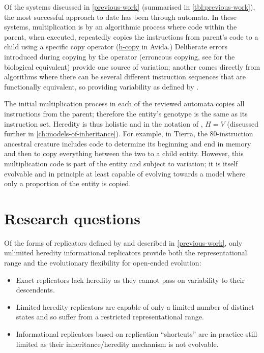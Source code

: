 Of the systems discussed in \cref{previous-work} (summarised in \cref{tbl:previous-work}), the most successful approach to date has been through automata. In these systems, multiplication is by an algorithmic process where code within the parent, when executed, repeatedly copies the instructions from parent's code to a child using a specific copy operator (\eg \url{h-copy} in Avida.) Deliberate errors introduced during copying by the operator (erroneous copying, see \textcite[p.16]{Zachar2010} for the biological equivalent) provide one source of variation; another comes directly from algorithms where there can be several different instruction sequences that are functionally equivalent, so providing variability as defined by \citeauthor{Zachar2010}.

The initial multiplication process in each of the reviewed automata copies all instructions from the parent; therefore the entity's genotype is the same as its instruction set. Heredity is thus holistic and in the notation of \citeauthor{Zachar2010}, $H=V$ (discussed further in \cref{ch:models-of-inheritance}). For example, in Tierra, the 80-instruction ancestral creature includes code to determine its beginning and end in memory and then to copy everything between the two to a child entity. However, this multiplication code is part of the entity and subject to variation; it is itself evolvable and in principle at least capable of evolving towards a model where only a proportion of the entity is copied.

\section{Research questions}\label{research-questions}

Of the forms of replicators defined by \textcite{Zachar2010} and described in \cref{previous-work}, only unlimited heredity informational replicators provide both the representational range and the evolutionary flexibility for open-ended evolution:

\begin{itemize}[noitemsep]
	\item Exact replicators lack heredity as they cannot pass on variability to their descendents.
	\item Limited heredity replicators are capable of only a limited number of distinct states and so suffer from a restricted representational range.
	\item Informational replicators based on replication ``shortcuts'' are in practice still limited as their inheritance/heredity mechanism is not evolvable.
\end{itemize} 

